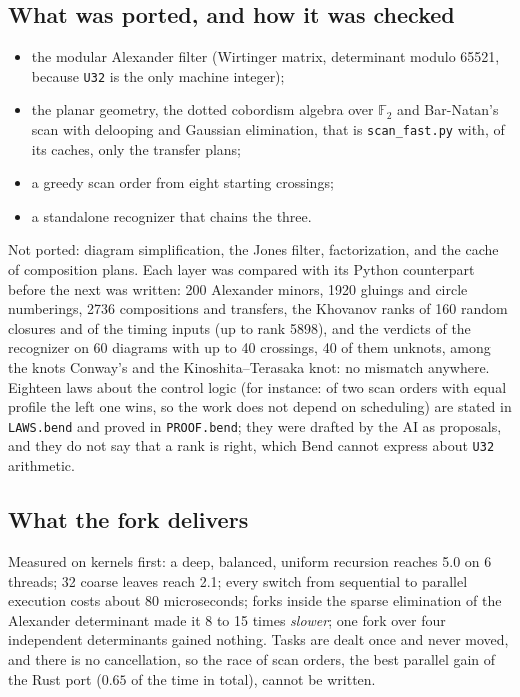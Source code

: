 \subsection{What was ported, and how it was checked}
\begin{itemize}
\item the modular Alexander filter (Wirtinger matrix, determinant modulo 65521,
  because \texttt{U32} is the only machine integer);
\item the planar geometry, the dotted cobordism algebra over $\mathbb{F}_2$ and
  Bar-Natan's scan with delooping and Gaussian elimination, that is
  \texttt{scan\_fast.py} with, of its caches, only the transfer plans;
\item a greedy scan order from eight starting crossings;
\item a standalone recognizer that chains the three.
\end{itemize}
Not ported: diagram simplification, the Jones filter, factorization, and the
cache of composition plans. Each layer was compared with its Python
counterpart before the next was written: 200 Alexander minors, 1920 gluings and
circle numberings, 2736 compositions and transfers, the Khovanov ranks of 160
random closures and of the timing inputs (up to rank 5898), and the verdicts of
the recognizer on 60 diagrams with up to 40 crossings, 40 of them unknots, among
the knots Conway's and the Kinoshita--Terasaka knot: no mismatch anywhere.
Eighteen laws about the control logic (for instance: of two scan orders with
equal profile the left one wins, so the work does not depend on scheduling) are
stated in \texttt{LAWS.bend} and proved in \texttt{PROOF.bend}; they were drafted
by the AI as proposals, and they do not say that a rank is right, which Bend
cannot express about \texttt{U32} arithmetic.

\subsection{What the fork delivers}
Measured on kernels first: a deep, balanced, uniform recursion reaches 5.0 on 6
threads; 32 coarse leaves reach 2.1; every switch from sequential to parallel
execution costs about 80 microseconds; forks inside the sparse elimination of
the Alexander determinant made it 8 to 15 times \emph{slower}; one fork over
four independent determinants gained nothing. Tasks are dealt once and never
moved, and there is no cancellation, so the race of scan orders, the best
parallel gain of the Rust port ($0.65$ of the time in total), cannot be written.

